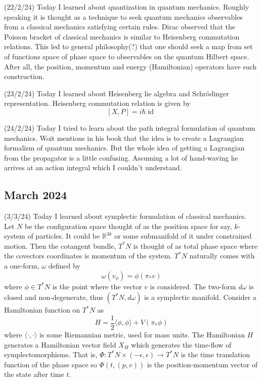 \documentclass[12pt,a4paper]{article}
\newcommand{\R}{\mathbb{R}}
\begin{document}
(22/2/24) Today I learned about quantization in quantum mechanics. Roughly speaking it is thought as a technique to seek quantum mechanics observables from a classical mechanics satisfying certain rules. Dirac observed that the Poisson bracket of classical mechanics is similar to Heisenberg commutation relations. This led to general philosophy(?) that one should seek a map from set of functions space of phase space to observables on the quantum Hilbert space. After all, the position, momentum and energy (Hamiltonian) operators have such construction.

(23/2/24) Today I learned about Heisenberg lie algebra and Schrödinger representation. Heisenberg commutation relation is given by 
\[ [X,P] = i \hbar \operatorname{id}_{} \]

(24/2/24) Today I tried to learn about the path integral formulation of quantum mechanics. Woit mentions in his book that the idea is to create a Lagrangian formalism of quantum mechanics. But the whole idea of getting a Lagrangian from the propagator is a little confusing. Assuming a lot of hand-waving he arrives at an action integral which I couldn't understand. 

\subsection*{March 2024}
\quad(3/3/24) Today I learned about symplectic formulation of classical mechanics. Let $ N $ be the configuration space thought of as the position space for say, $ k $-system of particles. It could be $ \R^{3k} $ or some submanifold of it under constrained motion. Then the cotangent bundle, $ T^{*}N $ is thought of as total phase space where the covectors coordinates is momentum of the system. $ T^{*}N $ naturally comes with a one-form, $ \omega $ defined by 
\[ \omega(v_{\phi}) = \phi(\pi_{*}v) \]
where $ \phi \in T^{*}N $ is the point where the vector $ v $ is considered. The two-form $ d \omega $ is closed and non-degenerate, thus $ (T^{*}N, d \omega) $ is a symplectic manifold. Consider a Hamiltonian function on $ T^{*}N $ as 
\[ H = \frac{1}{2} \langle \phi, \phi \rangle + V(\pi_{*}\phi) \]
where $ \langle \cdot, \cdot \rangle $ is some Riemannian metric, used for mass units. The Hamiltonian $ H $ generates a Hamiltonian vector field $ X_{H} $ which generates the time-flow of symplectomorphisms. That is, $ \Phi : T^{*}N \times (-\epsilon, \epsilon) \to T^{*}N $ is the time translation function of the phase space so $ \Phi(t,(p,v)) $ is the position-momentum vector of the state after time $ t $.
\end{document}
